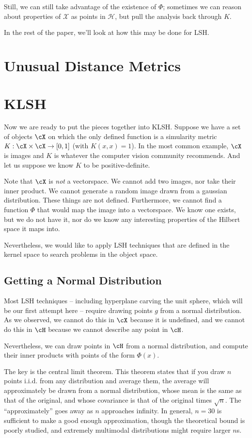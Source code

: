 \documentclass[twoside,11pt]{homework}
\begin{document}
\begin{multicols}{2}
Still, we can still take advantage of the existence of $\Phi$; sometimes we can reason about properties of $\mathcal{X}$ as points in $\mathcal{H}$, but pull the analysis back through $K$.

In the rest of the paper, we'll look at how this may be done for LSH.
\section{Unusual Distance Metrics} %
  
\section{KLSH}

Now we are ready to put the pieces together into KLSH.  Suppose we
have a set of objects $\cX$ on which the only defined function is a
simularity metric $K:\cX \times \cX \rightarrow [0,1]$ (with
$K(x,x)=1$).  In the most
common example, $\cX$ is images and $K$ is whatever the computer
vision community recommends.  And let us suppose we know $K$ to be
positive-definite.

Note that $\cX$ is \emph{not} a vectorspace.  We cannot add two
images, nor take their inner product.  We cannot generate a random
image drawn from a gaussian distribution.  These things are not
defined.  Furthermore, we cannot find a function $\Phi$ that would map
the image into a vectorspace.  We know one exists, but we do not have
it, nor do we know any interesting properties of the Hilbert space it
maps into.

Nevertheless, we would like to apply LSH techniques that are defined
in the kernel space to search problems in the object space.
  
\subsection{Getting a Normal Distribution} %

Most LSH techniques -- including hyperplane carving the unit sphere,
which will be our first attempt here -- require drawing points $g$ from a
normal distribution.  As we observed, we cannot do this in $\cX$
because it is undefined, and we cannot do this in $\cH$ because we
cannot describe any point in $\cH$.

Nevertheless, we can draw points in $\cH$ from a normal distribution,
and compute their inner products with points of the form $\Phi(x)$.

The key is the central limit theorem.  This theorem states that if you
draw $n$ points i.i.d. from any distribution and average
them, the average will approximately be drawn from a normal
distribution, whose mean is the same as that of the original, and
whose covariance is that of the original times $\sqrt{n}$.  The
``approximately'' goes away as $n$ approaches infinity.  In general,
$n=30$ is sufficient to make a good enough approximation, though the
theoretical bound is poorly studied, and extremely multimodal
distributions might require larger $n$s.


\end{multicols}
\end{document}
